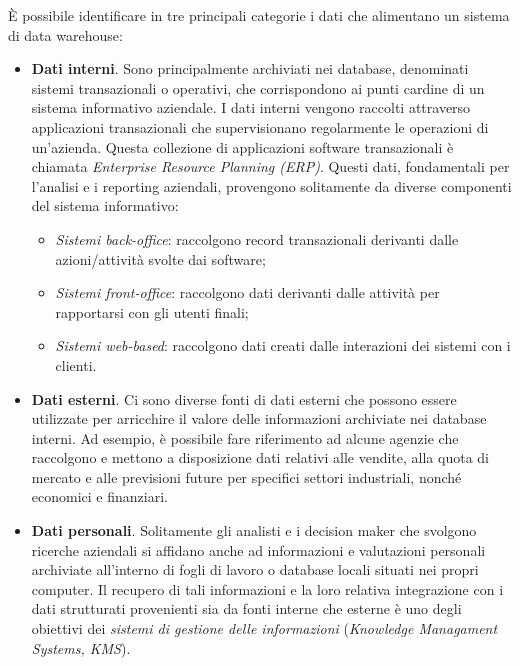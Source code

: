 È possibile identificare in tre principali categorie i dati che alimentano un sistema di data warehouse:\cite{vercellis_business_intelligence}
\begin{itemize}
    \item \textbf{Dati interni}. Sono principalmente archiviati nei database, denominati sistemi transazionali o operativi, che corrispondono ai punti cardine di un sistema informativo aziendale. I dati interni vengono raccolti attraverso applicazioni transazionali che supervisionano regolarmente le operazioni di un'azienda. Questa collezione di applicazioni software transazionali è chiamata \textit{Enterprise Resource Planning (ERP)}. Questi dati, fondamentali per l'analisi e i reporting aziendali, provengono solitamente da diverse componenti del sistema informativo:
        \begin{itemize}
            \item \textit{Sistemi back-office}: raccolgono record transazionali derivanti dalle azioni/attività svolte dai software;
            \item \textit{Sistemi front-office}: raccolgono dati derivanti dalle attività per rapportarsi con gli utenti finali;
            \item \textit{Sistemi web-based}: raccolgono dati creati dalle interazioni dei sistemi con i clienti.
        \end{itemize}
    \item \textbf{Dati esterni}. Ci sono diverse fonti di dati esterni che possono essere utilizzate per arricchire il valore delle informazioni archiviate nei database interni. Ad esempio, è possibile fare riferimento ad alcune agenzie che raccolgono e mettono a disposizione dati relativi alle vendite, alla quota di mercato e alle previsioni future per specifici settori industriali, nonché economici e finanziari. 
    \item \textbf{Dati personali}. Solitamente gli analisti e i decision maker che svolgono ricerche aziendali si affidano anche ad informazioni e valutazioni personali archiviate all'interno di fogli di lavoro o database locali situati nei propri computer. Il recupero di tali informazioni e la loro relativa integrazione con i dati strutturati provenienti sia da fonti interne che esterne è uno degli obiettivi dei \textit{sistemi di gestione delle informazioni} (\textit{Knowledge Managament Systems, KMS}).
\end{itemize}


